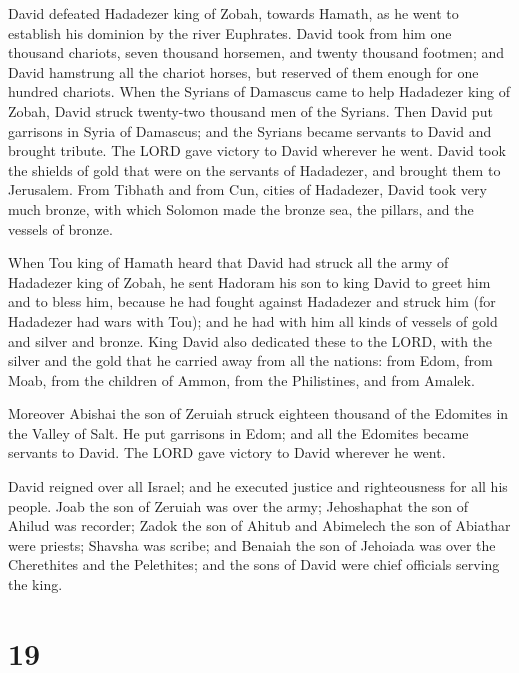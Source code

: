  David defeated Hadadezer king of Zobah, towards Hamath, as
he went to establish his dominion by the river Euphrates. 
David took from him one thousand chariots, seven thousand horsemen, and
twenty thousand footmen; and David hamstrung all the chariot horses, but
reserved of them enough for one hundred chariots.  When the
Syrians of Damascus came to help Hadadezer king of Zobah, David struck
twenty-two thousand men of the Syrians.  Then David put
garrisons in Syria of Damascus; and the Syrians became servants to David
and brought tribute. The LORD gave victory to David wherever he went.
 David took the shields of gold that were on the servants of
Hadadezer, and brought them to Jerusalem.  From Tibhath and
from Cun, cities of Hadadezer, David took very much bronze, with which
Solomon made the bronze sea, the pillars, and the vessels of bronze.

 When Tou king of Hamath heard that David had struck all the
army of Hadadezer king of Zobah,  he sent Hadoram his son
to king David to greet him and to bless him, because he had fought
against Hadadezer and struck him (for Hadadezer had wars with Tou); and
he had with him all kinds of vessels of gold and silver and bronze.
 King David also dedicated these to the LORD, with the
silver and the gold that he carried away from all the nations: from
Edom, from Moab, from the children of Ammon, from the Philistines, and
from Amalek.

 Moreover Abishai the son of Zeruiah struck eighteen
thousand of the Edomites in the Valley of Salt.  He put
garrisons in Edom; and all the Edomites became servants to David. The
LORD gave victory to David wherever he went.

 David reigned over all Israel; and he executed justice and
righteousness for all his people.  Joab the son of Zeruiah
was over the army; Jehoshaphat the son of Ahilud was recorder;
 Zadok the son of Ahitub and Abimelech the son of Abiathar
were priests; Shavsha was scribe;  and Benaiah the son of
Jehoiada was over the Cherethites and the Pelethites; and the sons of
David were chief officials serving the king.

\hypertarget{section-18}{%
\section{19}\label{section-18}}

